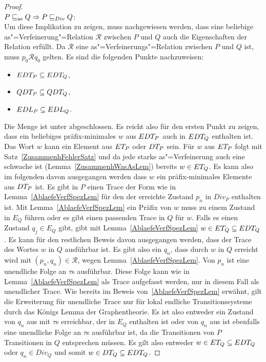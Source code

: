 \begin{proof}\mbox{}\\
  $P \sqsubseteq _{\mathrm{as}} Q \Rightarrow P  \sqsubseteq  _{Div} Q$:\\
  Um diese Implikation zu zeigen, muss nachgewiesen werden, dass eine beliebige
  as"=Verfeinerung"=Relation $\mathcal{R}$ zwischen $P$ und $Q$ auch die
  Eigenschaften der Relation \DRel{} erfüllt. Da $\mathcal{R}$ eine
  as"=Verfeinerungs"=Relation zwischen $P$ und $Q$ ist, muss $p_0 \mathcal{R}
  q_0$ gelten. Es sind die folgenden Punkte nachzuweisen:
  \begin{itemize}
    \item $EDT _P \subseteq EDT _Q$,
    \item $QDT _P \subseteq QDT _Q$,
    \item $EDL _P \subseteq EDL _Q$.
  \end{itemize}

  Die Menge \EDT{} ist unter \cont{} abgeschlossen. Es reicht also für den
  ersten Punkt zu zeigen, dass ein beliebiges präfix-minimales $w$ aus $EDT
  _P$ auch in $EDT _Q$ enthalten ist. Das Wort $w$ kann ein Element aus $ET
  _P$ oder $DT _P$ sein. Für $w$ aus $ET _P$ folgt mit
  Satz~\ref{ZusammenhFehlerSatz} und da jede starke as"=Verfeinerung auch eine
  schwache ist (Lemma~\ref{ZusammenhWasAsLem}) bereits $w\in ET _Q$. Es kann
  also im folgenden davon ausgegangen werden dass $w$ ein präfix-minimales
  Elemente aus $DT _P$ ist. Es gibt in $P$ einen Trace der Form wie in
  Lemma~\ref{AblaefeVerfSpezLem} für den der erreichte Zustand $p_n$ in $Div_P$
  enthalten ist. Mit Lemma~\ref{AblaefeVerfSpezLem} ein Präfix von $w$ muss zu
  einem Zustand in $E_Q$ führen oder es gibt einen passenden Trace in $Q$ für
  $w$. Falls es einen Zustand $q_j\in E_Q$ gibt, gibt mit
  Lemma~\ref{AblaefeVerfSpezLem} $w\in ET _Q \subseteq EDT _Q$. Es kann
  für den restlichen Beweis davon ausgegangen werden, dass der Trace des Wortes
  $w$ in $Q$ ausführbar ist. Es gibt also ein $q_n$, dass durch $w$ in $Q$
  erreicht wird mit $(p_n,q_n)\in\mathcal{R}$, wegen
  Lemma~\ref{AblaefeVerfSpezLem}. Von $p_n$ ist eine unendliche Folge an
  $\tau$s ausführbar. Diese Folge kann wie in Lemma~\ref{AblaefeVerfSpezLem}
  als Trace aufgefasst werden, nur in diesem Fall als unendlicher Trace. Wie
  bereits im Beweis von~\ref{AblaefeVerfSpezLem} erwähnt, gilt die Erweiterung
  für unendliche Trace nur für lokal endliche Transitionssysteme durch das
  Königs Lemma der Graphentheorie. Es ist also entweder ein Zustand von $q_n$
  aus mit $\tau$s erreichbar, der in $E_Q$ enthalten ist oder von $q_n$ aus ist
  ebenfalls eine unendliche Folge an $\tau$s ausführbar ist, da die
  Transitionen von $P$ Transitionen in $Q$ entsprechen müssen. Es gilt also
  entweder $w\in ET _Q\subseteq EDT _Q$ oder $q_n\in Div _Q$ und somit $w\in DT
  _Q\subseteq EDT _Q$.


\end{proof}
